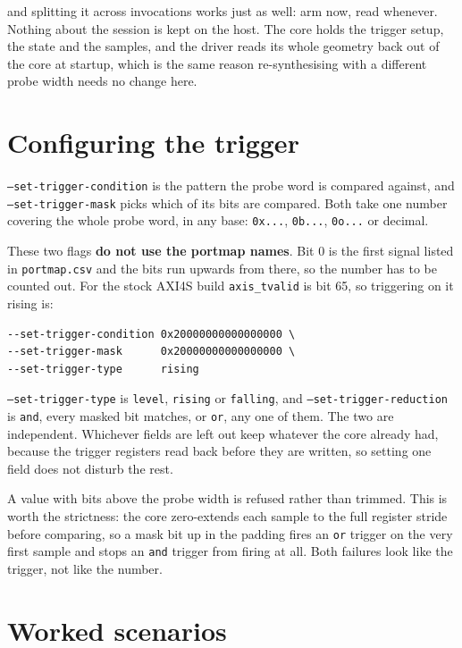 \documentclass[../manual.tex]{subfiles}
\begin{document}
and splitting it across invocations works just as well: arm now, read whenever. Nothing about the session is kept on the host. The core holds the trigger setup, the state and the samples, and the driver reads its whole geometry back out of the core at startup, which is the same reason re-synthesising with a different probe width needs no change here.

\section{Configuring the trigger}
\label{sec:cli_trigger}

\texttt{--set-trigger-condition} is the pattern the probe word is compared against, and \texttt{--set-trigger-mask} picks which of its bits are compared. Both take one number covering the whole probe word, in any base: \texttt{0x...}, \texttt{0b...}, \texttt{0o...} or decimal.

These two flags \textbf{do not use the portmap names}. Bit 0 is the first signal listed in \texttt{portmap.csv} and the bits run upwards from there, so the number has to be counted out. For the stock AXI4S build \texttt{axis\_tvalid} is bit 65, so triggering on it rising is:

\begin{lstlisting}
--set-trigger-condition 0x20000000000000000 \
--set-trigger-mask      0x20000000000000000 \
--set-trigger-type      rising
\end{lstlisting}

\texttt{--set-trigger-type} is \texttt{level}, \texttt{rising} or \texttt{falling}, and \texttt{--set-trigger-reduction} is \texttt{and}, every masked bit matches, or \texttt{or}, any one of them. The two are independent. Whichever fields are left out keep whatever the core already had, because the trigger registers read back before they are written, so setting one field does not disturb the rest.

A value with bits above the probe width is refused rather than trimmed. This is worth the strictness: the core zero-extends each sample to the full register stride before comparing, so a mask bit up in the padding fires an \texttt{or} trigger on the very first sample and stops an \texttt{and} trigger from firing at all. Both failures look like the trigger, not like the number.

\section{Worked scenarios}
\label{sec:cli_scenarios}
\end{document}
